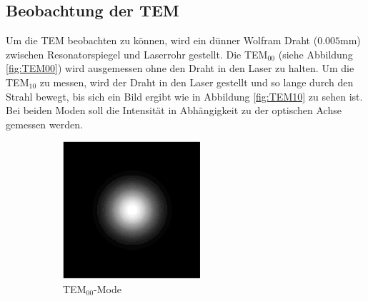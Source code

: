 \subsection{Beobachtung der TEM}
Um die TEM beobachten zu können, wird ein dünner Wolfram Draht ($0.005$mm) zwischen Resonatorspiegel und Laserrohr gestellt. Die TEM$_{00}$ (siehe Abbildung \eqref{fig:TEM00}) wird ausgemessen ohne den Draht in den Laser zu halten. Um die TEM$_{10}$ zu messen, wird der Draht in den Laser gestellt und so lange durch den Strahl bewegt, bis sich ein Bild ergibt wie in Abbildung \eqref{fig:TEM10} zu sehen ist. Bei beiden Moden soll die Intensität in Abhängigkeit zu der optischen Achse gemessen werden.

\begin{figure}
  \centering
  \begin{subfigure}[c]{0.4\textwidth}
    \includegraphics[width=\textwidth]{Bilder/TEM00.png}
    \caption{TEM$_{00}$-Mode}
    \label{fig:TEM00}
  \end{subfigure}
  \begin{subfigure}[c]{0.4\textwidth}

\end{subfigure}
\end{figure}
